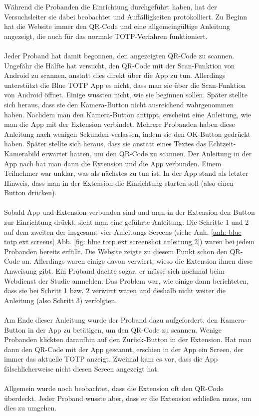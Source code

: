 Während die Probanden die Einrichtung durchgeführt haben, hat der Versuchsleiter sie dabei beobachtet und Auffälligkeiten protokolliert. Zu Beginn hat die Website immer den QR-Code und eine 
allgemeingültige Anleitung angezeigt, die auch für das normale TOTP-Verfahren 
funktioniert.
\\\\
Jeder Proband hat damit begonnen, den angezeigten QR-Code zu scannen. Ungefähr 
die Hälfte hat versucht, den QR-Code mit der Scan-Funktion von Android zu 
scannen, anstatt dies direkt über die App zu tun. Allerdings unterstützt die 
Blue TOTP App es nicht, dass man sie über die Scan-Funktion von Android öffnet.
Einige wussten nicht, wie sie beginnen sollen. Später stellte sich heraus, dass 
sie den Kamera-Button nicht ausreichend wahrgenommen haben.
Nachdem man den Kamera-Button antippt, erscheint eine Anleitung, wie man die 
App mit der Extension verbindet. Mehrere Probanden haben diese Anleitung nach 
wenigen Sekunden verlassen, indem sie den OK-Button gedrückt haben. Später 
stellte sich heraus, dass sie anstatt eines Textes das Echtzeit-Kamerabild 
erwartet hatten, um den QR-Code zu scannen.
Der Anleitung in der App nach hat man dann die Extension und die App verbunden. 
Einem Teilnehmer war unklar, was als nächstes zu tun ist. In der App stand als 
letzter Hinweis, dass man in der Extension die Einrichtung starten soll (also 
einen Button drücken).
\\\\
Sobald App und Extension verbunden sind und man in der Extension den Button zur 
Einrichtung drückt, sieht man eine geführte Anleitung.
Die Schritte 1 und 2 auf dem zweiten 
der insgesamt vier Anleitungs-Screens (siehe Anh. \ref{anh: blue totp ext screens} Abb. \ref{fig: blue totp ext screenshot anleitung 2}) waren bei jedem Probanden bereits 
erfüllt. Die Website zeigte zu diesem Punkt schon den QR-Code an. Allerdings 
waren einige davon verwirrt, wieso die Extension ihnen diese Anweisung gibt. 
Ein Proband dachte sogar, er müsse sich nochmal beim Webdienst der Studie 
anmelden. Das Problem war, wie einige dann berichteten, dass sie bei Schritt 1 
bzw. 2 verwirrt waren und deshalb nicht weiter die Anleitung (also Schritt 3) 
verfolgten.
\\\\
Am Ende dieser Anleitung wurde der Proband dazu aufgefordert, den Kamera-Button 
in der App zu betätigen, um den QR-Code zu scannen. Wenige Probanden klickten 
daraufhin auf den Zurück-Button in der Extension. Hat man dann den QR-Code mit 
der App gescannt, erschien in der App ein Screen, der immer das aktuelle TOTP 
anzeigt. Zweimal kam es vor, dass die App fälschlicherweise nicht diesen Screen 
angezeigt hat.
\\\\
Allgemein wurde noch beobachtet, dass die Extension oft den QR-Code überdeckt. 
Jeder Proband wusste aber, dass er die Extension schließen muss, um dies zu 
umgehen.